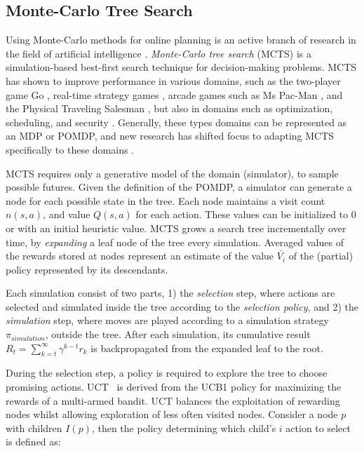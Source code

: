 \documentclass[conference]{IEEEtran}
\begin{document}
\subsection{Monte-Carlo Tree Search}
\label{sub:mcts}

Using Monte-Carlo methods for online planning is an active branch of research in the field of artificial intelligence \cf \cite{browne2012survey}. {\it Monte-Carlo tree search} (MCTS) \cite{coulom2007efficient,kocsis2006bandit} is a simulation-based best-first search technique for decision-making problems. MCTS has shown to improve performance in various domains, such as the two-player game Go \cite{lee2010current}, real-time strategy games \cite{browne2012survey}, arcade games such as Ms Pac-Man \cite{realtime2014}, and the Physical Traveling Salesman \cite{powleytsp}, but also in domains such as optimization, scheduling, and security \cite{browne2012survey}. Generally, these types domains can be represented as an MDP or POMDP, and new research has shifted focus to adapting MCTS specifically to these domains \cite{silver2010monte,Feldman12BRUE}. 

MCTS requires only a generative model of the domain (\ie simulator), to sample possible futures. Given the definition of the POMDP, a simulator can generate a node for each possible state in the tree. Each node maintains a visit count $n(s, a)$, and value $Q(s, a)$ for each action. These values can be initialized to $0$ or with an initial heuristic value. MCTS grows a search tree incrementally over time, by \emph{expanding} a leaf node of the tree every simulation. Averaged values of the rewards stored at nodes represent an estimate of the value $\bar{V_i}$ of the (partial) policy represented by its descendants.

Each simulation consist of two parts, 1) the \emph{selection} step, where actions are selected and simulated inside the tree according to the {\it selection policy}, and 2) the \emph{simulation} step, where moves are played according to a simulation strategy $\pi_{simulation}$, outside the tree. After each simulation, its cumulative result $R_t = \sum\nolimits_{k=t}^{\infty} \gamma^{k−t}r_k$ is backpropagated from the expanded leaf to the root. 

During the selection step, a policy is required to explore the tree to choose promising actions. UCT~\cite{kocsis2006bandit} is derived from the UCB1 policy \cite{auer2002using} for maximizing the rewards of a multi-armed bandit. UCT balances the exploitation of rewarding nodes whilst allowing exploration of less often visited nodes. Consider a node $p$ with children $I(p)$, then the policy determining which child's $i$ action to select is defined as:
\end{document}

